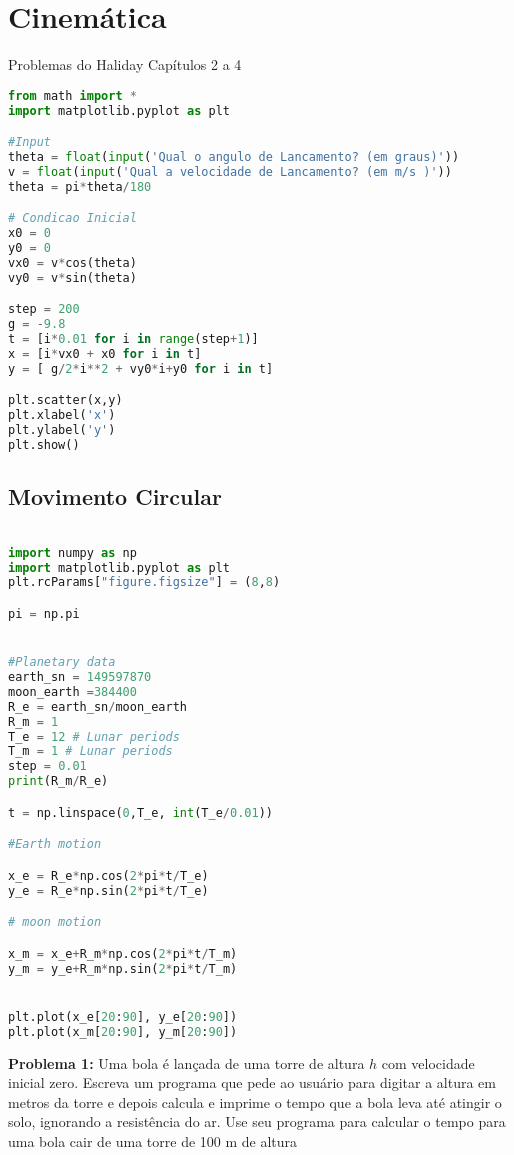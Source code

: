 \chapter{Cinemática}
Problemas do Haliday Capítulos 2 a 4

\begin{lstlisting}[language=Python, frame=lines,basicstyle=\footnotesize, caption={Lançamento de Projeteis}, label={lst:projeteis1}]
from math import *
import matplotlib.pyplot as plt

#Input
theta = float(input('Qual o angulo de Lancamento? (em graus)'))
v = float(input('Qual a velocidade de Lancamento? (em m/s )'))
theta = pi*theta/180

# Condicao Inicial
x0 = 0
y0 = 0
vx0 = v*cos(theta)
vy0 = v*sin(theta)

step = 200
g = -9.8
t = [i*0.01 for i in range(step+1)]
x = [i*vx0 + x0 for i in t]
y = [ g/2*i**2 + vy0*i+y0 for i in t]

plt.scatter(x,y)
plt.xlabel('x')
plt.ylabel('y')
plt.show()
\end{lstlisting}

\section{Movimento Circular}


\begin{lstlisting}[language=Python, frame=lines,basicstyle=\footnotesize, caption={Movimento da Terra e Lua ao Redor do Sol}, label={lst:earth-moon1}]

import numpy as np
import matplotlib.pyplot as plt
plt.rcParams["figure.figsize"] = (8,8)

pi = np.pi


#Planetary data
earth_sn = 149597870
moon_earth =384400
R_e = earth_sn/moon_earth
R_m = 1
T_e = 12 # Lunar periods
T_m = 1 # Lunar periods
step = 0.01
print(R_m/R_e)

t = np.linspace(0,T_e, int(T_e/0.01))

#Earth motion

x_e = R_e*np.cos(2*pi*t/T_e)
y_e = R_e*np.sin(2*pi*t/T_e)

# moon motion

x_m = x_e+R_m*np.cos(2*pi*t/T_m)
y_m = y_e+R_m*np.sin(2*pi*t/T_m)


plt.plot(x_e[20:90], y_e[20:90])
plt.plot(x_m[20:90], y_m[20:90])

\end{lstlisting}



{\bf Problema 1:}
Uma bola é lançada de uma torre de altura $h$ com velocidade inicial zero. Escreva um
programa que pede ao usuário para digitar a altura em metros da torre e depois calcula
e imprime o tempo que a bola leva até atingir o solo, ignorando a resistência do ar. Use
seu programa para calcular o tempo para uma bola cair de uma torre de 100 m de altura

